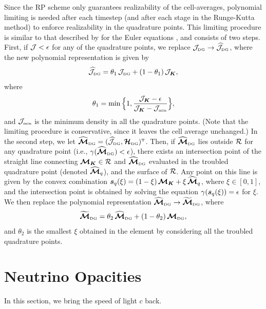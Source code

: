 \documentclass[10pt,preprint]{aastex}
\newcommand{\ee}[1]{{\color{red} #1}}
\begin{document}
Since the RP scheme only guarantees realizability of the cell-averages, polynomial limiting is needed after each timestep (and after each stage in the Runge-Kutta method) to enforce realizability in the quadrature points.  
This limiting procedure is similar to that described by \citet{ZS2010a} for the Euler equations \citep[see also][]{liuOsher_1996}, and consists of two steps.  
First, if $\mathcal{J}<\epsilon$ for any of the quadrature points, we replace $\mathcal{J}_{\mbox{\tiny DG}}\to\widehat{\mathcal{J}}_{\mbox{\tiny DG}}$, where the new polynomial representation is given by
\begin{equation}
  \widehat{\mathcal{J}}_{\mbox{\tiny DG}}=\theta_{1}\,\mathcal{J}_{\mbox{\tiny DG}}+(1-\theta_{1})\,\mathcal{J}_{\boldsymbol{K}},
\end{equation}
where
\begin{equation}
  \theta_{1}=\min\Big\{1,\frac{\mathcal{J}_{\boldsymbol{K}}-\epsilon}{\mathcal{J}_{\boldsymbol{K}}-\mathcal{J}_{\mbox{\tiny min}}}\Big\},
\end{equation}
and $\mathcal{J}_{\mbox{\tiny min}}$ is the minimum density in all the quadrature points.  
(Note that the limiting procedure is conservative, since it leaves the cell average unchanged.)  
In the second step, we let $\widehat{\boldsymbol{\mathcal{M}}}_{\mbox{\tiny DG}}=(\widehat{\mathcal{J}}_{\mbox{\tiny DG}},\boldsymbol{\mathcal{H}}_{\mbox{\tiny DG}})^{\mbox{\tiny T}}$.  
Then, if $\widehat{\boldsymbol{\mathcal{M}}}_{\mbox{\tiny DG}}$ lies outside $\mathcal{R}$ for any quadrature point (i.e., $\gamma(\widehat{\boldsymbol{\mathcal{M}}}_{\mbox{\tiny DG}})<\epsilon$), there exists an intersection point of the straight line connecting $\boldsymbol{\mathcal{M}}_{\boldsymbol{K}}\in\mathcal{R}$ and $\widehat{\boldsymbol{\mathcal{M}}}_{\mbox{\tiny DG}}$ evaluated in the troubled quadrature point (denoted $\widehat{\boldsymbol{\mathcal{M}}}_{q}$), and the surface of $\mathcal{R}$.  
Any point on this line is given by the convex combination $\boldsymbol{s}_{q}(\xi)=(1-\xi)\,\boldsymbol{\mathcal{M}}_{\boldsymbol{K}}+\xi\,\widehat{\boldsymbol{\mathcal{M}}}_{q}$, where $\xi\in[0,1]$, and the intersection point is obtained by solving the equation $\gamma(\boldsymbol{s}_{q}(\xi))=\epsilon$ for $\xi$.  
We then replace the polynomial representation $\widehat{\boldsymbol{\mathcal{M}}}_{\mbox{\tiny DG}}\to\widetilde{\boldsymbol{\mathcal{M}}}_{\mbox{\tiny DG}}$, where
\begin{equation}
  \widetilde{\boldsymbol{\mathcal{M}}}_{\mbox{\tiny DG}}=\theta_{2}\,\widehat{\boldsymbol{\mathcal{M}}}_{\mbox{\tiny DG}}+(1-\theta_{2})\,\boldsymbol{\mathcal{M}}_{\mbox{\tiny DG}},
\end{equation}
and $\theta_{2}$ is the smallest $\xi$ obtained in the element by considering all the troubled quadrature points.  

\section{Neutrino Opacities}
\label{sec:opacities}

In this section, we bring the speed of light $c$ back.
\end{document}
